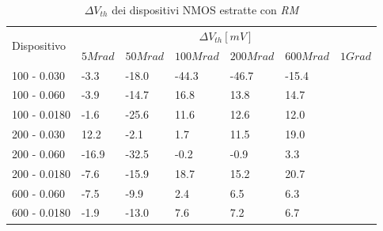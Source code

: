 \documentclass[12pt, letterpaper]{book}
\begin{document}
\begin{table}[H]
  \renewcommand{\arraystretch}{1.3}
  \begin{tabular}{m{2.1cm}  m{1.1cm} m{1.3cm} m{1.5cm} m{1.5cm} m{1.5cm} m{1cm}}
    \toprule
    \multirow{2}{*}{Dispositivo} & \multicolumn{6}{c}{$\Delta V_{th} [mV] $}                                                          \\
    \cmidrule{2-7}
                                 & $5Mrad$                                   & $50Mrad$ & $100Mrad$ & $200Mrad$ & $600Mrad$ & $1Grad$ \\
    \midrule
    100 - 0.030                     & -3.3                                      & -18.0    & -44.3     & -46.7     & -15.4     &         \\
    \hline
    100 - 0.060                     & -3.9                                      & -14.7    & 16.8      & 13.8      & 14.7      &         \\
    \hline
    100 - 0.0180                    & -1.6                                      & -25.6    & 11.6      & 12.6      & 12.0      &         \\
    \hline
    200 - 0.030                     & 12.2                                      & -2.1     & 1.7       & 11.5      & 19.0      &         \\
    \hline
    200 - 0.060                     & -16.9                                     & -32.5    & -0.2      & -0.9      & 3.3       &         \\
    \hline
    200 - 0.0180                    & -7.6                                      & -15.9    & 18.7      & 15.2      & 20.7      &         \\
    \hline
    600 - 0.060                     & -7.5                                      & -9.9     & 2.4       & 6.5       & 6.3       &         \\
    \hline
    600 - 0.0180                    & -1.9                                      & -13.0    & 7.6       & 7.2       & 6.7       &         \\
    \bottomrule
  \end{tabular}
  \caption{$\Delta V_{th}$ dei dispositivi NMOS estratte con \emph{RM}}
  \label{tab:deltaVthRMN}
\end{table}
\end{document}
